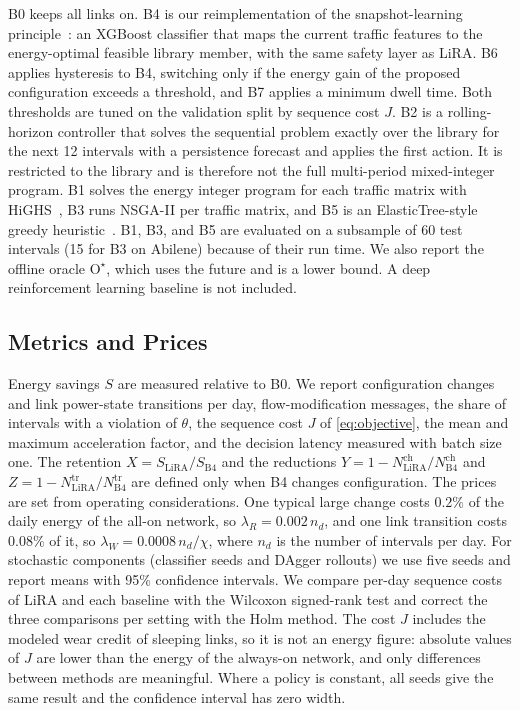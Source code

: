 \documentclass[journal]{IEEEtran}
\begin{document}
B0 keeps all links on. B4 is our reimplementation of the snapshot-learning principle~\cite{gomezdelahiz2025noms,gomezdelahiz2026tgcn}: an XGBoost classifier that maps the current traffic features to the energy-optimal feasible library member, with the same safety layer as LiRA. B6 applies hysteresis to B4, switching only if the energy gain of the proposed configuration exceeds a threshold, and B7 applies a minimum dwell time. Both thresholds are tuned on the validation split by sequence cost $J$. B2 is a rolling-horizon controller that solves the sequential problem exactly over the library for the next 12 intervals with a persistence forecast and applies the first action. It is restricted to the library and is therefore not the full multi-period mixed-integer program. B1 solves the energy integer program for each traffic matrix with HiGHS~\cite{huangfu2018highs}, B3 runs NSGA-II per traffic matrix, and B5 is an ElasticTree-style greedy heuristic~\cite{heller2010elastictree}. B1, B3, and B5 are evaluated on a subsample of 60 test intervals (15 for B3 on Abilene) because of their run time. We also report the offline oracle $\mathrm{O}^\star$, which uses the future and is a lower bound. A deep reinforcement learning baseline is not included.

\subsection{Metrics and Prices}

Energy savings $S$ are measured relative to B0. We report configuration changes and link power-state transitions per day, flow-modification messages, the share of intervals with a violation of $\theta$, the sequence cost $J$ of \eqref{eq:objective}, the mean and maximum acceleration factor, and the decision latency measured with batch size one. The retention $X=S_{\mathrm{LiRA}}/S_{\mathrm{B4}}$ and the reductions $Y=1-N^{\mathrm{ch}}_{\mathrm{LiRA}}/N^{\mathrm{ch}}_{\mathrm{B4}}$ and $Z=1-N^{\mathrm{tr}}_{\mathrm{LiRA}}/N^{\mathrm{tr}}_{\mathrm{B4}}$ are defined only when B4 changes configuration. The prices are set from operating considerations. One typical large change costs $0.2\%$ of the daily energy of the all-on network, so $\lambda_R=0.002\,n_d$, and one link transition costs $0.08\%$ of it, so $\lambda_W=0.0008\,n_d/\chi$, where $n_d$ is the number of intervals per day. For stochastic components (classifier seeds and DAgger rollouts) we use five seeds and report means with 95\% confidence intervals. We compare per-day sequence costs of LiRA and each baseline with the Wilcoxon signed-rank test and correct the three comparisons per setting with the Holm method. The cost $J$ includes the modeled wear credit of sleeping links, so it is not an energy figure: absolute values of $J$ are lower than the energy of the always-on network, and only differences between methods are meaningful. Where a policy is constant, all seeds give the same result and the confidence interval has zero width.
\end{document}
